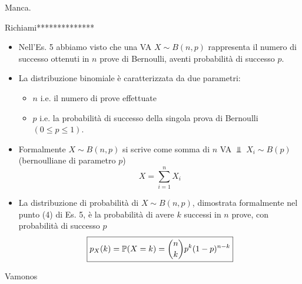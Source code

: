 \Soluzione

Manca.

\Soluzione

Richiami**************
\begin{itemize}
\item Nell'Es. 5 abbiamo visto che una VA $X\sim B( n,p)$ rappresenta il numero di successo ottenuti in $n$ prove di Bernoulli, aventi probabilità di successo $p$.
\item La distribuzione binomiale è caratterizzata da due parametri:
\begin{itemize}
\item $n$ i.e. il numero di prove effettuate
\item $p$ i.e. la probabilità di successo della singola prova di Bernoulli $( 0\leq p\leq 1)$.
\end{itemize}
\item Formalmente $X\sim B( n,p)$ si scrive come somma di $n$ VA $\Bot $ $X_{i} \sim B( p)$ (bernoulliane di parametro $p$)
\begin{equation*}
X=\sum\limits _{i=1}^{n} X_{i}
\end{equation*}
\item La distribuzione di probabilità di $X\sim B( n,p)$, dimostrata formalmente nel punto (4) di Es. 5, è la probabilità di avere $k$ successi in $n$ prove, con probabilità di successo $p$
\begin{equation*}
\boxed{p_{X}( k) =\mathbb{P}( X=k) =\binom{n}{k} p^{k}( 1-p)^{n-k}}
\end{equation*}
\end{itemize}

Vamonos

